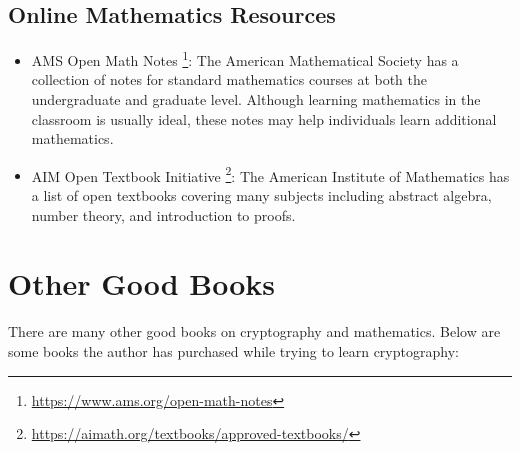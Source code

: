 \subsection{Online Mathematics Resources}
\label{ssec:conclusion_online_math}

\begin{itemize}
\item AMS Open Math Notes%
    \footnote{\url{https://www.ams.org/open-math-notes}}:
    The American Mathematical Society has a collection of notes
    for standard mathematics courses at both the undergraduate
    and graduate level.
    Although learning mathematics in the classroom is usually ideal,
    these notes may help individuals learn additional
    mathematics.
\item AIM Open Textbook Initiative%
    \footnote{\url{https://aimath.org/textbooks/approved-textbooks/}}:
    The American Institute of Mathematics has a list of open textbooks
    covering many subjects including abstract algebra, \gls{number theory},
    and introduction to proofs.
\end{itemize}



\section{Other Good Books}

There are many other good books on cryptography and mathematics.
Below are some books the author has purchased while trying
to learn cryptography:

